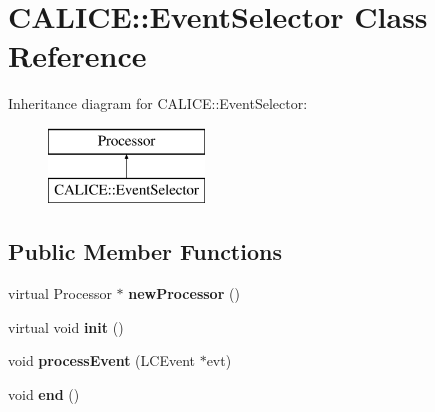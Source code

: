 \section{C\-A\-L\-I\-C\-E\-:\-:Event\-Selector Class Reference}
\label{classCALICE_1_1EventSelector}
Inheritance diagram for C\-A\-L\-I\-C\-E\-:\-:Event\-Selector\-:\begin{figure}[H]
\begin{center}
\leavevmode
\includegraphics[height=2.000000cm]{classCALICE_1_1EventSelector}
\end{center}
\end{figure}
\subsection*{Public Member Functions}
\begin{DoxyCompactItemize}
\item 
virtual Processor $\ast$ {\bfseries new\-Processor} ()\label{classCALICE_1_1EventSelector_a36b81e0575a2e14335f47a5084f4f3b2}

\item 
virtual void {\bfseries init} ()\label{classCALICE_1_1EventSelector_a6e9b4eb3db9cc056bbdc2c3aaa265273}

\item 
void {\bfseries process\-Event} (L\-C\-Event $\ast$evt)\label{classCALICE_1_1EventSelector_aae415b2d0ced1750d9c93c7318b8953a}

\item 
void {\bfseries end} ()\label{classCALICE_1_1EventSelector_a41de050eb673f31568813d9e9854ed4e}

\end{DoxyCompactItemize}
